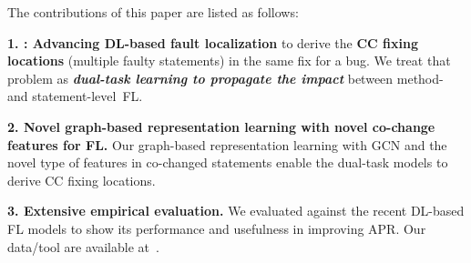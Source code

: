 


The contributions of this paper are listed as follows:

{\bf 1. {\tool}: Advancing DL-based fault localization} to derive the
{\bf CC fixing locations} (multiple faulty statements) in the same fix
for a bug. We treat that problem as {\bf {\em dual-task learning to
    propagate the impact}} between method- and statement-level~FL.


{\bf 2. Novel graph-based representation learning with novel co-change
  features for FL.} Our graph-based representation learning with GCN
and the novel type of features in co-changed statements enable the
dual-task models to derive CC fixing locations.

{\bf 3. Extensive empirical evaluation.} We evaluated {\tool} against
the recent DL-based FL models to show its performance and
usefulness in improving APR. Our data/tool are available
at~\cite{FixLocator2022}.

